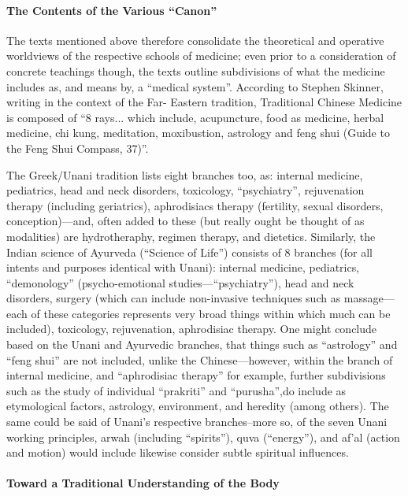 \paragraph{The Contents of the Various ``Canon''}


The texts mentioned above therefore consolidate the theoretical and operative worldviews of the respective schools of medicine; even prior to a consideration of concrete teachings though, the texts outline subdivisions of what the medicine includes as, and means by, a ``medical system''. According to Stephen Skinner, writing in the context of the Far- Eastern tradition, Traditional Chinese Medicine is composed of ``8 rays... which include, acupuncture, food as medicine, herbal medicine, chi kung, meditation, moxibustion, astrology and feng shui (Guide to the Feng Shui Compass, 37)''.

The Greek/Unani tradition lists eight branches too, as: internal medicine, pediatrics, head and neck disorders, toxicology, ``psychiatry'', rejuvenation therapy (including geriatrics), aphrodisiacs therapy (fertility, sexual disorders, conception)---and, often added to these (but really ought be thought of as modalities) are hydrotheraphy, regimen therapy, and dietetics. Similarly, the Indian science of Ayurveda (``Science of Life'') consists of 8 branches (for all intents and purposes identical with Unani): internal medicine, pediatrics, ``demonology'' (psycho-emotional studies---``psychiatry''), head and neck disorders, surgery (which can include non-invasive techniques such as massage---each of these categories represents very broad things within which much can be included), toxicology, rejuvenation, aphrodisiac therapy. One might conclude based on the Unani and Ayurvedic branches, that things such as ``astrology'' and ``feng shui'' are not included, unlike the Chinese---however, within the branch of internal medicine, and ``aphrodisiac therapy'' for example, further subdivisions such as the study of individual ``prakriti'' and ``purusha'',do include as etymological factors, astrology, environment, and heredity (among others). The same could be said of Unani's respective branches--more so, of the seven Unani working principles, arwah (including ``spirits''), quva (``energy''), and af'al (action and motion) would include likewise consider subtle spiritual influences.

\paragraph{Toward a Traditional Understanding of the Body}


